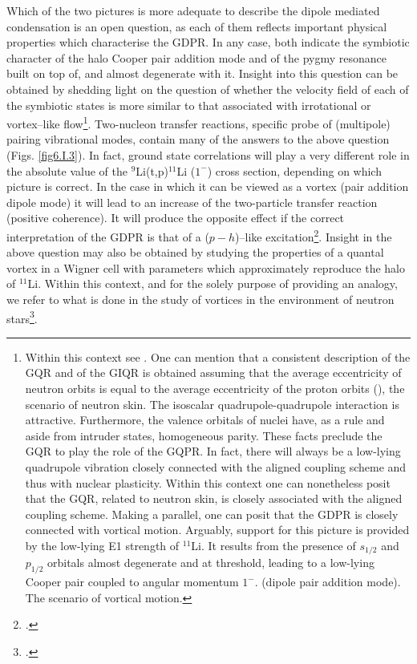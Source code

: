 \begin{subappendices}
Which of the two  pictures is more adequate to describe  the dipole mediated condensation is an open question,  
as each of them reflects  important physical properties which   characterise  the GDPR. In any case, both indicate the symbiotic character  of the halo Cooper pair  addition mode  and of the pygmy resonance  built on top of, and almost degenerate with it. 
Insight into this question can be obtained  by shedding light on the question  of whether  the velocity field of each of the symbiotic  states is more similar  to that associated  with irrotational or vortex--like flow\footnote{Within this context see \cite{Repko:13}. One can  mention that a consistent description of the GQR and of the GIQR is obtained 
assuming that the average eccentricity of neutron orbits 
is equal to the average eccentricity of the proton orbits (\cite{Bes:75}), the scenario of neutron skin.
The  isoscalar quadrupole-quadrupole interaction is attractive. Furthermore, 
the valence orbitals of nuclei have, as a rule and aside from intruder states, homogeneous parity. These facts  preclude 
the GQR to play the role of the GQPR. In fact, there will always be a low-lying quadrupole vibration closely 
connected with the aligned coupling scheme and thus  with nuclear plasticity. Within this context one can  nonetheless  posit  that the GQR, related to neutron skin,  is closely associated with the aligned coupling scheme.
Making a parallel, one can posit  that the GDPR is closely connected with vortical motion. 
Arguably,  support for this picture is provided by the   low-lying  E1 
strength of $^{11}$Li. It  results from the presence of $s_{1/2}$ and $p_{1/2}$ orbitals almost degenerate and at threshold, 
leading to a low-lying Cooper pair coupled to angular momentum $1^-$. (dipole pair addition mode). 
The  scenario of vortical motion. }. Two-nucleon transfer reactions, specific probe  of (multipole) pairing vibrational modes, contain many of the answers to the above question (Figs. \ref{fig6.I.3}). 
In fact,  ground state correlations will play a very different role in the absolute value of the $^9$Li(t,p)$^{11}$Li ($1^-$) cross section,
depending  on which picture is correct. In the case in which 
it can be 
 viewed as a vortex (pair addition dipole mode) it will lead to an increase of the two-particle transfer reaction 
 (positive coherence).
 It will  produce the opposite effect if the correct interpretation of the GDPR   is that of a 
($p-h$)--like excitation\footnote{ \cite{Broglia:71}.}. 
Insight  in the above question may also be obtained by studying  the properties of
a quantal vortex in a Wigner cell with parameters which approximately reproduce 
the halo of $^{11}$Li. Within this context, and  for the solely purpose of providing an analogy, we refer 
to what is done in the study of vortices in the environment of neutron stars\footnote{\cite{Avogadro:07,Avogadro:08}.}.


\end{subappendices}
